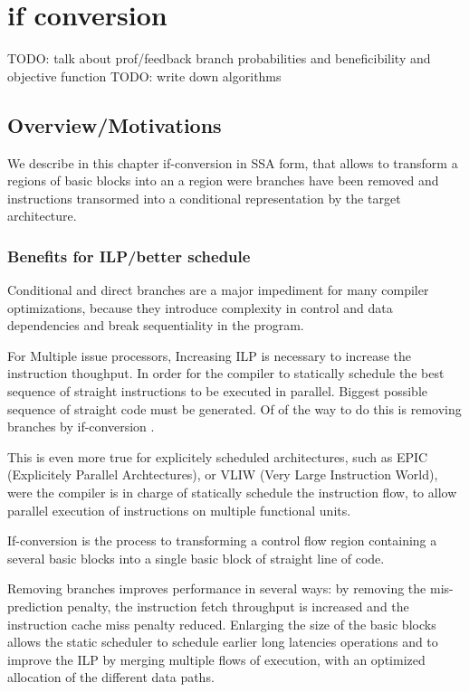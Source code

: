 \chapter{if conversion }
\graphicspath{{img/}{if_conversion/img/}{part4/if_conversion/img/}}
	
\newcommand\cond{~?~}

TODO: talk about prof/feedback branch probabilities and beneficibility and objective function
TODO: write down algorithms

\section{Overview/Motivations}

We describe in this chapter if-conversion in SSA form, that allows to transform a regions of basic blocks into an a region were branches have been removed and instructions transormed into a conditional representation by the target architecture.

\subsection{Benefits for ILP/better schedule}

Conditional and direct branches are a major impediment for many compiler optimizations, because they introduce complexity in control and data dependencies and break sequentiality in the program. 

For Multiple issue processors, Increasing ILP \cite{Rau:2003:IP:1074100.1074489} is necessary to increase the instruction thoughput. In order for the compiler to statically schedule the best sequence of straight instructions to be executed in parallel. Biggest possible sequence of straight code must be generated. Of of the way to do this is removing branches by if-conversion \cite{Schlansker97achievinghigh}.

This is even more true for explicitely scheduled architectures, such as EPIC (Explicitely Parallel Archtectures), or VLIW (Very Large Instruction World), were the compiler is in charge of statically schedule the instruction flow, to allow parallel execution of instructions on multiple functional units. 

If-conversion is the process to transforming a control flow region containing a several basic blocks into a single basic block of straight line of code.

Removing branches improves performance in several ways: by removing the mis-prediction penalty, the instruction fetch throughput is increased and the instruction cache miss penalty reduced. Enlarging the size of the basic blocks allows the static scheduler to schedule earlier long latencies operations and to improve the ILP by merging multiple flows of execution, with an optimized allocation of the different data paths. 

